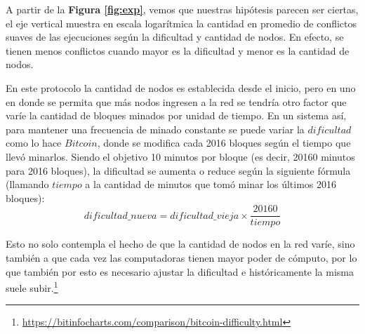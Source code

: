 \documentclass[10pt, a4paper, hidelinks]{article}
\begin{document}
A partir de la \textbf{Figura \ref{fig:exp}}, vemos que nuestras hipótesis parecen ser ciertas, el eje vertical muestra en escala logarítmica la cantidad en promedio de conflictos suaves de las ejecuciones según la dificultad y cantidad de nodos. En efecto, se tienen menos conflictos cuando mayor es la dificultad y menor es la cantidad de nodos.

En este protocolo la cantidad de nodos es establecida desde el inicio, pero en uno en donde se permita que más nodos ingresen a la red se tendría otro factor que varíe la cantidad de bloques minados por unidad de tiempo. En un sistema así, para mantener una frecuencia de minado constante se puede variar la $dificultad$ como lo hace $Bitcoin$, donde se modifica cada 2016 bloques según el tiempo que llevó minarlos. Siendo el objetivo 10 minutos por bloque (es decir, 20160 minutos para 2016 bloques), la dificultad se aumenta o reduce según la siguiente fórmula (llamando $tiempo$ a la cantidad de minutos que tomó minar los últimos 2016 bloques):
\begin{equation*}
dificultad\_nueva = dificultad\_vieja \times \frac{20160}{tiempo}
\end{equation*}

Esto no solo contempla el hecho de que la cantidad de nodos en la red varíe, sino también a que cada vez las computadoras tienen mayor poder de cómputo, por lo que también por esto es necesario ajustar la dificultad e históricamente la misma suele subir.\footnote{\url{https://bitinfocharts.com/comparison/bitcoin-difficulty.html}}

\newpage


\end{document}
